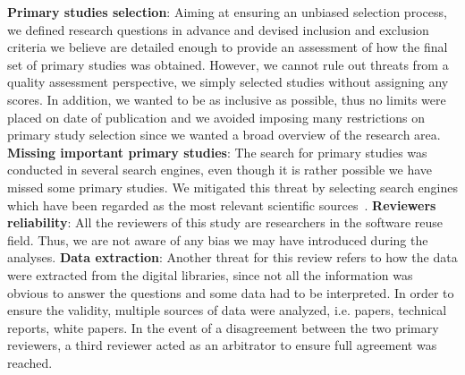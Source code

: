 \textbf{Primary studies selection}: Aiming at ensuring an unbiased selection process, we defined research questions in advance and devised inclusion and exclusion criteria we believe are detailed enough to provide an assessment of how the final set of primary studies was obtained. However, we cannot rule out threats from a quality assessment perspective, we simply selected studies without assigning any scores. In addition, we wanted to be as inclusive as possible, thus no limits were placed on date of publication and we avoided imposing many restrictions on primary study selection since we wanted a broad overview of the research area. \textbf{Missing important primary studies}: The search for primary studies was conducted in several search engines, even though it is rather possible we have missed some primary studies. We mitigated this threat by selecting search engines which have been regarded as the most relevant scientific sources~\cite{Kitchenham}. \textbf{Reviewers reliability}: All the reviewers of this study are researchers in the software reuse field. Thus, we are not aware of any bias we may have introduced during the analyses. \textbf{Data extraction}: Another threat for this review refers to how the data were extracted from the digital libraries, since not all the information was obvious to answer the questions and some data had to be interpreted. In order to ensure the validity, multiple sources of data were analyzed, i.e. papers, technical reports, white papers. In the event of a disagreement between the two primary reviewers, a third reviewer acted as an arbitrator to ensure full agreement was reached.